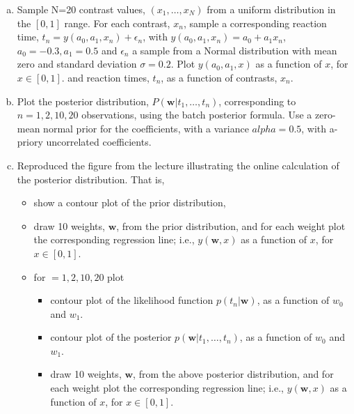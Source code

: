 \documentclass[12pt]{article}
\begin{document}
\begin{enumerate}[(a)]

    \item Sample N=20 contrast values, $(x_1,\ldots,x_N)$ from a uniform
        distribution in the $[0,1]$ range. For each contrast, $x_n$, sample a
        corresponding reaction time, $t_n=y(a_0,a_1,x_n)+\epsilon_n$, with
        $y(a_0,a_1,x_n)=a_0+a_1x_n$, $a_0=-0.3, a_1=0.5$ and $\epsilon_n$ a
        sample from a Normal distribution with mean zero and standard deviation
        $\sigma=0.2$. Plot $y(a_0,a_1,x)$ as a function of $x$, for
        $x\in[0,1]$. and reaction times, $t_n$, as a function of contrasts,
        $x_n$.

    \item Plot the posterior distribution, $P(\mathbf{w}|t_1,\ldots,t_n)$,
        corresponding to $n=1, 2, 10, 20$ observations, using
        the batch posterior formula. Use a zero-mean normal prior for the
        coefficients, with a variance $alpha=0.5$, with a-priory uncorrelated
        coefficients.

    \item Reproduced the figure from the lecture illustrating the online
        calculation of the posterior distribution. That is, 

        \begin{itemize}
            \item show a contour plot of the prior distribution,

            \item draw 10 weights, $\mathbf{w}$, from the prior
                distribution, and for each weight plot the corresponding
                regression line; i.e., $y(\mathbf{w}, x)$ as a function of $x$,
                for $x\in[0,1]$.

            \item for $=1, 2, 10, 20$ plot

                \begin{itemize}

                    \item contour plot of the likelihood function
                        $p(t_n|\mathbf{w})$, as a function of $w_0$ and $w_1$.

                    \item contour plot of the posterior
                        $p(\mathbf{w}|t_1,\ldots,t_n)$, as a function of $w_0$
                        and $w_1$.

                    \item draw 10 weights, $\mathbf{w}$, from the above
                        posterior distribution, and for each weight plot the
                        corresponding regression line; i.e., $y(\mathbf{w}, x)$
                        as a function of $x$, for $x\in[0,1]$.


\end{itemize}
\end{itemize}
\end{enumerate}
\end{document}
